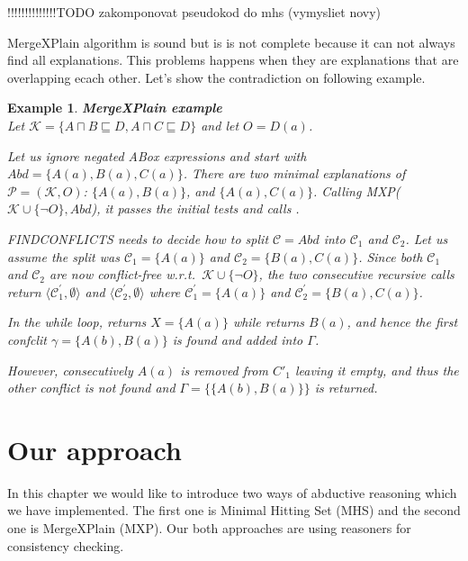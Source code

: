 \documentclass[12pt,a4paper]{article}
\newtheorem{example}{Example}[subsection]
\begin{document}
!!!!!!!!!!!!!!TODO zakomponovat pseudokod do mhs (vymysliet novy)

MergeXPlain algorithm is sound but is is not complete because it can not always find all explanations. This problems happens when they are explanations that are overlapping ecach other. Let's show the contradiction on following example.

\begin{example}{\textbf{MergeXPlain example}}
	\\
	Let $\mathcal{K} = \{ A \sqcap B \sqsubseteq D, A \sqcap C \sqsubseteq D\}$ and let $O = D(a)$. 
	
	Let us ignore negated ABox expressions and start with $Abd = \{ A(a), B(a),
	C(a)\}$. There are two minimal explanations of $\mathcal{P} = (\mathcal{K},O)$: $\{A(a),B(a)\}$, and	$\{A(a),C(a)\}$. Calling MXP($\mathcal{K} \cup \{\neg O\}, Abd$), it passes the
	initial tests and calls .

	\textsc{FINDCONFLICTS} needs to decide how to split $\mathcal{C} = Abd$ into $\mathcal{C}_{1}$
	and $\mathcal{C}_{2}$. Let us assume the split was $\mathcal{C}_{1} = \{A(a)\}$ and $\mathcal{C}_{2} =
	\{B(a),C(a)\}$. Since both $\mathcal{C}_{1}$ and $\mathcal{C}_{2}$ are now conflict-free w.r.t.\
	$\mathcal{K} \cup \{\neg O\}$, the two consecutive recursive calls return
	$\langle \mathcal{C}^{\prime}_{1},\emptyset \rangle$ and $\langle \mathcal{C}^{\prime}_{2},\emptyset \rangle$ where
	$\mathcal{C}^{\prime}_{1}=\{A(a)\}$ and $\mathcal{C}^{\prime}_{2}=\{B(a),C(a)\}$.
	
	In the while loop, \Call{GETCONFLICT}{$\mathcal{K} \cup \{\neg O\}\cup
		\{B(a),C(a)\},$ $\{B(a),C(a)\},$ $\{A(a)\}$} returns $X = \{A(a)\}$ while
	 returns $B(a)$, and hence the first
	confclit $\gamma = \{A(b),B(a)\}$ is found and added into $\Gamma$.
	
	However, consecutively $A(a)$ is removed from $C'_1$ leaving it empty,
	and thus the other conflict is not found and $\Gamma = \{\{A(b),B(a)\}\}$ is
	returned.	
\end{example}

\section{Our approach}
In this chapter we would like to introduce two ways of abductive reasoning which we have implemented. The first one is Minimal Hitting Set (MHS) and the second one is MergeXPlain (MXP). Our both approaches are using reasoners for consistency checking. 
\end{document}
